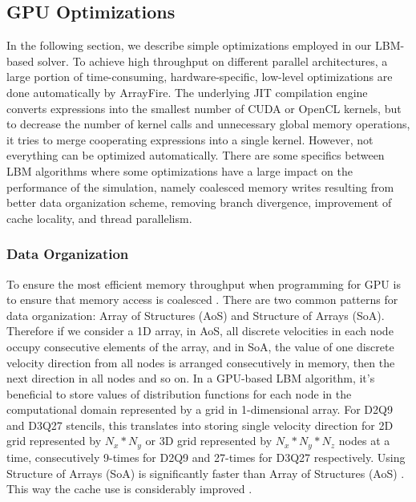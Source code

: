 \subsection{GPU Optimizations}
\label{optimizations-for-gpu}

In the following section, we describe simple optimizations employed in our LBM-based solver. To achieve high throughput on different parallel architectures, a large portion of time-consuming, hardware-specific, low-level optimizations are done automatically by ArrayFire. The underlying JIT compilation engine converts expressions into the smallest number of CUDA or OpenCL kernels, but to decrease the number of kernel calls and unnecessary global memory operations, it tries to merge cooperating expressions into a single kernel. However, not everything can be optimized automatically. There are some specifics between LBM algorithms where some optimizations have a large impact on the performance of the simulation, namely coalesced memory writes resulting from better data organization scheme, removing branch divergence, improvement of cache locality, and thread parallelism.

\subsubsection{Data Organization}
To ensure the most efficient memory throughput when programming for GPU is to ensure that memory access is coalesced \citep{tranPerformanceOptimization3D2017}. There are two common patterns for data organization: Array of Structures (AoS) and Structure of Arrays (SoA). Therefore if we consider a 1D array, in AoS, all discrete velocities in each node occupy consecutive elements of the array, and in SoA, the value of one discrete velocity direction from all nodes is arranged consecutively in memory, then the next direction in all nodes and so on. In a GPU-based LBM algorithm, it's beneficial to store values of distribution functions for each node in the computational domain represented by a grid in 1-dimensional array. For D2Q9 and D3Q27 stencils, this translates into storing single velocity direction for 2D grid represented by $N_x * N_y$ or 3D grid represented by $N_x * N_y * N_z$ nodes at a time, consecutively 9-times for D2Q9 and 27-times for D3Q27 respectively. Using Structure of Arrays (SoA) is significantly faster than Array of Structures (AoS) \citep{tranPerformanceOptimization3D2017, delboscOptimizedImplementationLattice2014}. This way the cache use is considerably improved \citep{Mawson2014InteractiveFI}.


